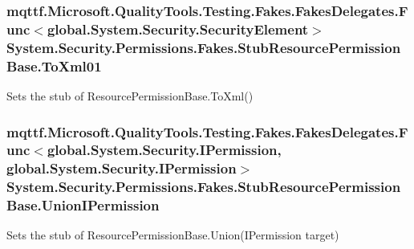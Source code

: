 \hypertarget{class_system_1_1_security_1_1_permissions_1_1_fakes_1_1_stub_resource_permission_base_af6ad443dc2c2ac55ea7147a5c3a960d2}{
\subsubsection[{To\-Xml01}]{\setlength{\rightskip}{0pt plus 5cm}mqttf.\-Microsoft.\-Quality\-Tools.\-Testing.\-Fakes.\-Fakes\-Delegates.\-Func$<$global.\-System.\-Security.\-Security\-Element$>$ System.\-Security.\-Permissions.\-Fakes.\-Stub\-Resource\-Permission\-Base.\-To\-Xml01}}\label{class_system_1_1_security_1_1_permissions_1_1_fakes_1_1_stub_resource_permission_base_af6ad443dc2c2ac55ea7147a5c3a960d2}


Sets the stub of Resource\-Permission\-Base.\-To\-Xml()

\hypertarget{class_system_1_1_security_1_1_permissions_1_1_fakes_1_1_stub_resource_permission_base_ab805313ce0295eab0dd91328eefe1fd7}{
\subsubsection[{Union\-I\-Permission}]{\setlength{\rightskip}{0pt plus 5cm}mqttf.\-Microsoft.\-Quality\-Tools.\-Testing.\-Fakes.\-Fakes\-Delegates.\-Func$<$global.\-System.\-Security.\-I\-Permission, global.\-System.\-Security.\-I\-Permission$>$ System.\-Security.\-Permissions.\-Fakes.\-Stub\-Resource\-Permission\-Base.\-Union\-I\-Permission}}\label{class_system_1_1_security_1_1_permissions_1_1_fakes_1_1_stub_resource_permission_base_ab805313ce0295eab0dd91328eefe1fd7}


Sets the stub of Resource\-Permission\-Base.\-Union(\-I\-Permission target)



